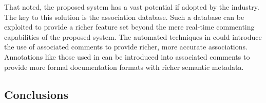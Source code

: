 That noted, the proposed system has a vast potential if adopted by the industry.
The key to this solution is the association database. Such a database can be
exploited to provide a richer feature set beyond the mere real-time commenting 
capabilities of the proposed system. The automated techniques in 
\cite{Antoniol1999, Antoniol2000} could introduce the use of associated comments
to provide richer, more accurate associations. Annotations like those used in
\cite{Javadoc} can be introduced into associated comments to provide more formal
documentation formats with richer semantic metadata.

\subsection{Conclusions}